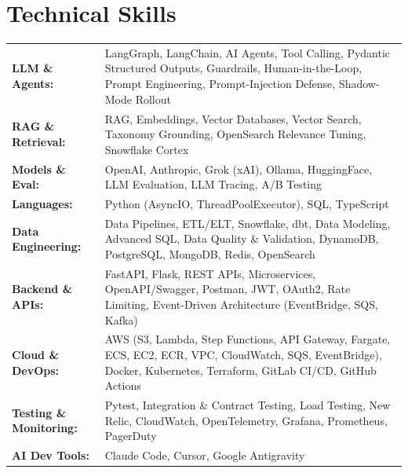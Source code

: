 \documentclass[10pt]{article}
\begin{document}
\section*{Technical Skills}
{\small\begin{tabularx}{\linewidth}{@{}p{1.2in}X@{}}
\textbf{LLM \& Agents:} & LangGraph, LangChain, AI Agents, Tool Calling, Pydantic Structured Outputs, Guardrails, Human-in-the-Loop, Prompt Engineering, Prompt-Injection Defense, Shadow-Mode Rollout \\[2pt]
\textbf{RAG \& Retrieval:} & RAG, Embeddings, Vector Databases, Vector Search, Taxonomy Grounding, OpenSearch Relevance Tuning, Snowflake Cortex \\[2pt]
\textbf{Models \& Eval:} & OpenAI, Anthropic, Grok (xAI), Ollama, HuggingFace, LLM Evaluation, LLM Tracing, A/B Testing \\[2pt]
\textbf{Languages:} & Python (AsyncIO, ThreadPoolExecutor), SQL, TypeScript \\[2pt]
\textbf{Data Engineering:} & Data Pipelines, ETL/ELT, Snowflake, dbt, Data Modeling, Advanced SQL, Data Quality \& Validation, DynamoDB, PostgreSQL, MongoDB, Redis, OpenSearch \\[2pt]
\textbf{Backend \& APIs:} & FastAPI, Flask, REST APIs, Microservices, OpenAPI/Swagger, Postman, JWT, OAuth2, Rate Limiting, Event-Driven Architecture (EventBridge, SQS, Kafka) \\[2pt]
\textbf{Cloud \& DevOps:} & AWS (S3, Lambda, Step Functions, API Gateway, Fargate, ECS, EC2, ECR, VPC, CloudWatch, SQS, EventBridge), Docker, Kubernetes, Terraform, GitLab CI/CD, GitHub Actions \\[2pt]
\textbf{Testing \& Monitoring:} & Pytest, Integration \& Contract Testing, Load Testing, New Relic, CloudWatch, OpenTelemetry, Grafana, Prometheus, PagerDuty \\[2pt]
\textbf{AI Dev Tools:} & Claude Code, Cursor, Google Antigravity \\
\end{tabularx}}
\end{document}
